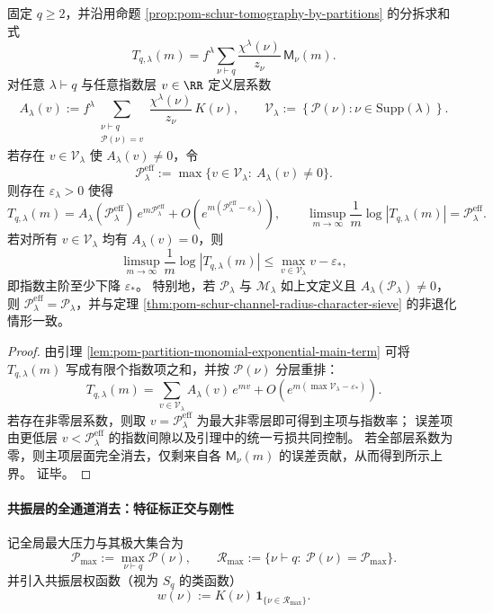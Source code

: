 \begin{theorem}\label{thm:pom-schur-trace-finite-laplace-principle}
固定 \(q\ge 2\)，并沿用命题 \ref{prop:pom-schur-tomography-by-partitions} 的分拆求和式
\[
T_{q,\lambda}(m)=f^\lambda\sum_{\nu\vdash q}\frac{\chi^\lambda(\nu)}{z_\nu}\,\mathsf{M}_\nu(m).
\]
对任意 \(\lambda\vdash q\) 与任意指数层 \(v\in\RR\) 定义层系数
\[
A_\lambda(v):=
f^\lambda\!\!\sum_{\substack{\nu\vdash q\\ \mathcal{P}(\nu)=v}}\frac{\chi^\lambda(\nu)}{z_\nu}\,K(\nu),
\qquad
\mathcal{V}_\lambda:=\left\{\mathcal{P}(\nu):\nu\in\mathrm{Supp}(\lambda)\right\}.
\]
若存在 \(v\in\mathcal{V}_\lambda\) 使 \(A_\lambda(v)\neq 0\)，令
\[
\mathcal{P}_\lambda^{\mathrm{eff}}
:=
\max\{v\in\mathcal{V}_\lambda:\ A_\lambda(v)\neq 0\}.
\]
则存在 \(\varepsilon_\lambda>0\) 使得
\[
T_{q,\lambda}(m)
=
A_\lambda(\mathcal{P}_\lambda^{\mathrm{eff}})\,e^{m\mathcal{P}_\lambda^{\mathrm{eff}}}
+O\!\left(e^{m(\mathcal{P}_\lambda^{\mathrm{eff}}-\varepsilon_\lambda)}\right),
\qquad
\limsup_{m\to\infty}\frac{1}{m}\log|T_{q,\lambda}(m)|=\mathcal{P}_\lambda^{\mathrm{eff}}.
\]
若对所有 \(v\in\mathcal{V}_\lambda\) 均有 \(A_\lambda(v)=0\)，则
\[
\limsup_{m\to\infty}\frac{1}{m}\log|T_{q,\lambda}(m)|
\le
\max_{v\in\mathcal{V}_\lambda}v-\varepsilon_*,
\]
即指数主阶至少下降 \(\varepsilon_*\)。
特别地，若 \(\mathcal{P}_\lambda\) 与 \(\mathcal{M}_\lambda\) 如上文定义且 \(A_\lambda(\mathcal{P}_\lambda)\neq 0\)，则 \(\mathcal{P}_\lambda^{\mathrm{eff}}=\mathcal{P}_\lambda\)，并与定理 \ref{thm:pom-schur-channel-radius-character-sieve} 的非退化情形一致。
\end{theorem}
\begin{proof}
由引理 \ref{lem:pom-partition-monomial-exponential-main-term} 可将 \(T_{q,\lambda}(m)\) 写成有限个指数项之和，并按 \(\mathcal{P}(\nu)\) 分层重排：
\[
T_{q,\lambda}(m)=\sum_{v\in\mathcal{V}_\lambda} A_\lambda(v)\,e^{mv}+O\!\left(e^{m(\max\mathcal{V}_\lambda-\varepsilon_*)}\right).
\]
若存在非零层系数，则取 \(v=\mathcal{P}_\lambda^{\mathrm{eff}}\) 为最大非零层即可得到主项与指数率；
误差项由更低层 \(v<\mathcal{P}_\lambda^{\mathrm{eff}}\) 的指数间隙以及引理中的统一亏损共同控制。
若全部层系数为零，则主项层面完全消去，仅剩来自各 \(\mathsf{M}_\nu(m)\) 的误差贡献，从而得到所示上界。
证毕。
\end{proof}

\paragraph{共振层的全通道消去：特征标正交与刚性}
记全局最大压力与其极大集合为
\[
\mathcal{P}_{\max}:=\max_{\nu\vdash q}\mathcal{P}(\nu),
\qquad
\mathcal{R}_{\max}:=\{\nu\vdash q:\ \mathcal{P}(\nu)=\mathcal{P}_{\max}\}.
\]
并引入共振层权函数（视为 \(S_q\) 的类函数）
\[
w(\nu):=K(\nu)\,\mathbf 1_{\{\nu\in\mathcal{R}_{\max}\}}.
\]

